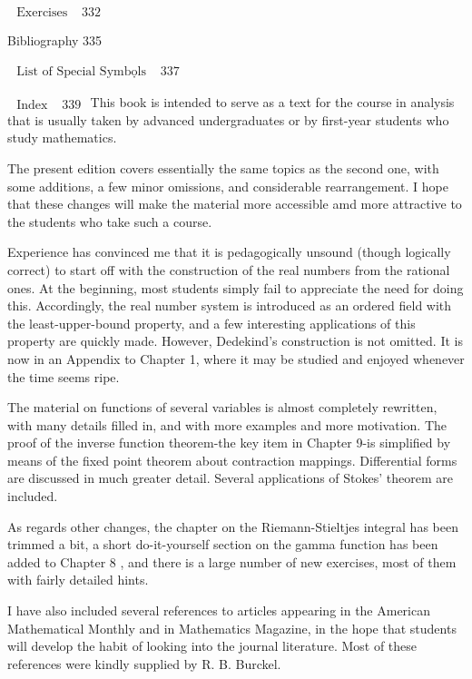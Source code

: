 \documentclass[10pt]{article}
\begin{document}
$\begin{array}{ll}\text { Exercises } & 332\end{array}$

Bibliography
335

$\begin{array}{ll}\text { List of Special Symbọls } & 337\end{array}$

$\begin{array}{ll}\text { Index } & 339\end{array}$ This book is intended to serve as a text for the course in analysis that is usually taken by advanced undergraduates or by first-year students who study mathematics.

The present edition covers essentially the same topics as the second one, with some additions, a few minor omissions, and considerable rearrangement. I hope that these changes will make the material more accessible amd more attractive to the students who take such a course.

Experience has convinced me that it is pedagogically unsound (though logically correct) to start off with the construction of the real numbers from the rational ones. At the beginning, most students simply fail to appreciate the need for doing this. Accordingly, the real number system is introduced as an ordered field with the least-upper-bound property, and a few interesting applications of this property are quickly made. However, Dedekind's construction is not omitted. It is now in an Appendix to Chapter 1, where it may be studied and enjoyed whenever the time seems ripe.

The material on functions of several variables is almost completely rewritten, with many details filled in, and with more examples and more motivation. The proof of the inverse function theorem-the key item in Chapter 9-is simplified by means of the fixed point theorem about contraction mappings. Differential forms are discussed in much greater detail. Several applications of Stokes' theorem are included.

As regards other changes, the chapter on the Riemann-Stieltjes integral has been trimmed a bit, a short do-it-yourself section on the gamma function has been added to Chapter 8 , and there is a large number of new exercises, most of them with fairly detailed hints.

I have also included several references to articles appearing in the American Mathematical Monthly and in Mathematics Magazine, in the hope that students will develop the habit of looking into the journal literature. Most of these references were kindly supplied by $\mathrm{R}$. B. Burckel.
\end{document}
